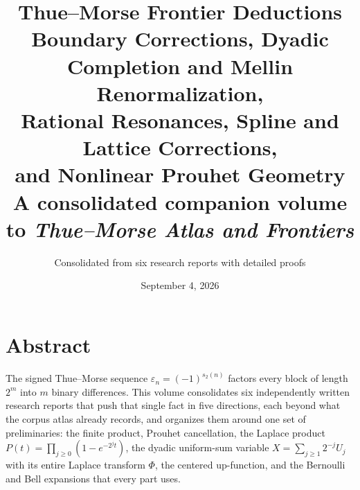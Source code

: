 \documentclass[11pt,a4paper,oneside,openany]{book}
\title{\Huge\bfseries Thue--Morse Frontier Deductions\\[4mm]
 \Large Boundary Corrections, Dyadic Completion and Mellin Renormalization,\\
 Rational Resonances, Spline and Lattice Corrections,\\
 and Nonlinear Prouhet Geometry\\[7mm]
 \large A consolidated companion volume to \emph{Thue--Morse Atlas and Frontiers}}
\author{Consolidated from six research reports with detailed proofs}
\date{September 4, 2026}
\numberwithin{equation}{chapter}
\theoremstyle{definition}
\theoremstyle{remark}
\newcommand{\eps}{\varepsilon}
\begin{document}
\frontmatter
\hypersetup{pageanchor=false}
\maketitle
\hypersetup{pageanchor=true}
\chapter*{Abstract}
The signed Thue--Morse sequence $\eps_n=(-1)^{s_2(n)}$ factors every block of
length $2^m$ into $m$ binary differences. This volume consolidates six
independently written research reports that push that single fact in five
directions, each beyond what the corpus atlas already records, and organizes
them around one set of preliminaries: the finite product, Prouhet
cancellation, the Laplace product $P(t)=\prod_{j\ge0}(1-e^{-2^jt})$, the
dyadic uniform-sum variable $X=\sum_{j\ge1}2^{-j}U_j$ with its entire Laplace
transform $\Phi$, the centered up-function, and the Bernoulli and Bell
expansions that every part uses.
\end{document}
